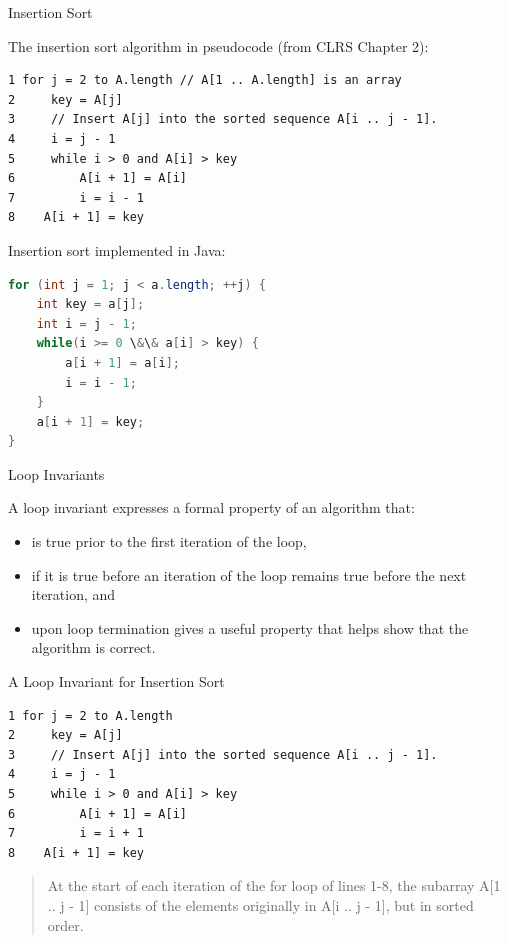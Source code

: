 \documentclass{beamer}
\begin{document}
\begin{frame}[fragile]{Insertion Sort}


The insertion sort algorithm in pseudocode (from CLRS Chapter 2):
\vspace{-.05in}
\begin{lstlisting}[]
1 for j = 2 to A.length // A[1 .. A.length] is an array
2     key = A[j]
3     // Insert A[j] into the sorted sequence A[i .. j - 1].
4     i = j - 1
5     while i > 0 and A[i] > key
6         A[i + 1] = A[i]
7         i = i - 1
8    A[i + 1] = key
\end{lstlisting}

Insertion sort implemented in Java:
\vspace{-.05in}
\begin{lstlisting}[language=Java]
for (int j = 1; j < a.length; ++j) {
    int key = a[j];
    int i = j - 1;
    while(i >= 0 \&\& a[i] > key) {
        a[i + 1] = a[i];
        i = i - 1;
    }
    a[i + 1] = key;
}
\end{lstlisting}

\end{frame}

\begin{frame}[fragile]{Loop Invariants}


A loop invariant expresses a formal property of an algorithm that:
\begin{itemize}
\item is true prior to the first iteration of the loop,
\item if it is true before an iteration of the loop remains true before the next iteration, and
\item upon loop termination gives a useful property that helps show that the algorithm is correct.
\end{itemize}


\end{frame}

\begin{frame}[fragile]{A Loop Invariant for Insertion Sort}

\begin{lstlisting}[]
1 for j = 2 to A.length
2     key = A[j]
3     // Insert A[j] into the sorted sequence A[i .. j - 1].
4     i = j - 1
5     while i > 0 and A[i] > key
6         A[i + 1] = A[i]
7         i = i + 1
8    A[i + 1] = key
\end{lstlisting}

\begin{quote}
At the start of each iteration of the for loop of lines 1-8, the subarray A[1 .. j - 1] consists of the elements originally in A[i .. j - 1], but in sorted order.
\end{quote}

\end{frame}
\end{document}
